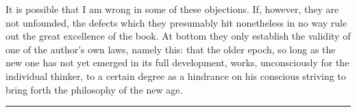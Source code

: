 \documentclass[12pt,a4paper,openany]{book}
\newcommand{\piecerule}{\par\begin{center}\rule{1.5cm}{0.4pt}\end{center}\par}
\begin{document}
It is possible that I am wrong in some of these objections. If,
however, they are not unfounded, the defects which they presumably
hit nonetheless in no way rule out the great excellence of the
book. At bottom they only establish the validity of one of the
author's own laws, namely this: that the older epoch, so long as
the new one has not yet emerged in its full development, works,
unconsciously for the individual thinker, to a certain degree as a
hindrance on his conscious striving to bring forth the philosophy
of the new age.
\piecerule
\end{document}
